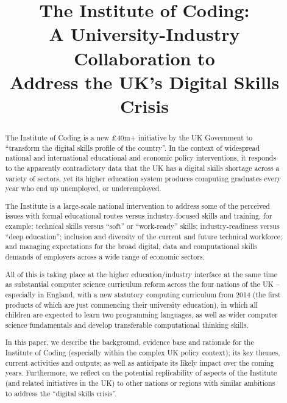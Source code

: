 \documentclass[conference]{IEEEtran}
\begin{document}
\title{The Institute of Coding:\\A University-Industry Collaboration
  to\\Address the UK's Digital Skills Crisis}

 
\maketitle

\begin{abstract}
The Institute of Coding is a new \pounds40m+ initiative by the UK
Government to ``transform the digital skills profile of the
country''. In the context of widespread national and international
educational and economic policy interventions, it responds to the
apparently contradictory data that the UK has a digital skills
shortage across a variety of sectors, yet its higher education system
produces computing graduates every year who end up unemployed, or
underemployed.

The Institute is a large-scale national intervention to address some
of the perceived issues with formal educational routes versus
industry-focused skills and training, for example: technical skills
versus ``soft'' or ``work-ready'' skills; industry-readiness versus
``deep education''; inclusion and diversity of the current and future
technical workforce; and managing expectations for the broad digital,
data and computational skills demands of employers across a wide range
of economic sectors.

All of this is taking place at the higher education/industry interface
at the same time as substantial computer science curriculum reform
across the four nations of the UK -- especially in England, with a new
statutory computing curriculum from 2014 (the first products of which
are just commencing their university education), in which all children
are expected to learn two programming languages, as well as wider
computer science fundamentals and develop transferable computational
thinking skills.

In this paper, we describe the background, evidence base and rationale
for the Institute of Coding (especially within the complex UK policy
context); its key themes, current activities and outputs; as well as
anticipate its likely impact over the coming years. Furthermore, we
reflect on the potential replicability of aspects of the Institute
(and related initiatives in the UK) to other nations or regions with
similar ambitions to address the ``digital skills crisis''.
\end{abstract}
\end{document}
